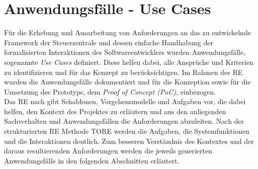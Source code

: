 \section{Anwendungsfälle - Use Cases}
\label{sec:usecases}
    Für die Erhebung und Ausarbeitung von Anforderungen an das zu entwickelnde Framework der Steuerzentrale und dessen 
    einfache Handhabung der formalisierten Interaktionen des Softwareentwicklers wurden Anwendungsfälle, sogenannte 
    \textit{Use Cases} definiert. Diese helfen dabei, alle Ansprüche und Kriterien zu identifizieren und für das 
    Konzept zu berücksichtigen. Im Rahmen des \acl{RE} wurden die Anwendungsfälle dokumentiert und für die Konzeption sowie 
    für die Umsetzung des Prototyps, dem \textit{Proof of Concept (PoC)}, einbezogen. 
    \\ 
    Das \acs{RE} nach \cite{pohl2021basiswissen} gibt Schablonen, Vorgehensmodelle und Aufgaben 
    vor, die dabei helfen, den Kontext des Projektes zu erläutern und aus den anliegenden Sachverhalten und Anwendungsfällen 
    die Anforderungen abzuleiten. Nach der strukturierten \acs{RE} Methode \ac{TORE} \cite{tore2014} werden die 
    Aufgaben, die Systemfunktionen und die Interaktionen deutlich. Zum besseren Verständnis des Kontextes und der daraus 
    resultierenden Anforderungen werden die jeweils generierten Anwendungsfälle in den folgenden Abschnitten 
    erläutert.

